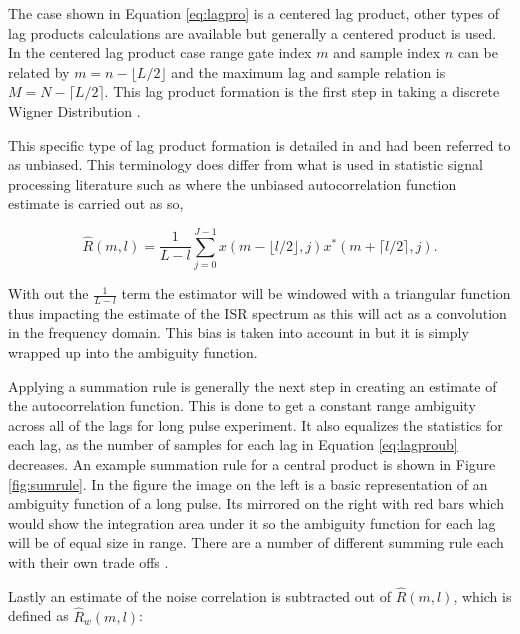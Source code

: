 \documentclass[draft,ras]{agutex}
\begin{document}
\begin{article}
The case shown in Equation \ref{eq:lagpro} is a centered lag product, other types of lag products calculations are available but generally a centered product is used. In the centered lag product case range gate index $m$ and sample index $n$ can be related by $m=n-\lfloor L/2\rfloor$ and the maximum lag and sample relation is $M=N-\lceil L/2 \rceil$.  This lag product formation is the first step in taking a discrete Wigner Distribution \citep{TFAcohen}.

This specific type of lag product formation is detailed in \citep{farley1969} and had been referred to as unbiased. This terminology does differ from what is used in statistic signal processing literature such as \citep{randomsigshanmugan} where the unbiased autocorrelation function estimate is carried out as so,

\begin{equation}
\label{eq:lagproub}
\hat{R}(m,l) = \frac{1}{L-l}\displaystyle\sum\limits_{j=0}^{J-1} x(m-\lfloor l/2\rfloor,j)x^*(m+\lceil l/2 \rceil,j).
\end{equation}

\noindent With out the $\frac{1}{L-l}$ term the estimator will be windowed with a triangular function thus impacting the estimate of the ISR spectrum as this will act as a convolution in the frequency domain. This bias is taken into account in \citep{farley1969} but it is simply wrapped up into the ambiguity function. 

Applying a summation rule is generally the next step in creating an estimate of the autocorrelation function.  This is done to get a constant range ambiguity across all of the lags for long pulse experiment\citep{nygren1996}. It also equalizes the statistics for each lag, as the number of samples for each lag in Equation \ref{eq:lagproub} decreases.  An example summation rule for a central product is shown in Figure \ref{fig:sumrule}. In the figure the image on the left is a basic representation of an ambiguity function of a long pulse.  Its mirrored on the right with red bars which would show the integration area under it so the ambiguity function for each lag will be of equal size in range. There are a number of different summing rule each with their own trade offs \citep{nygren1996}.


Lastly an estimate of the noise correlation is subtracted out of $\hat{R}(m,l)$, which is defined as $\hat{R}_w(m,l)$:


\end{article}
\end{document}
